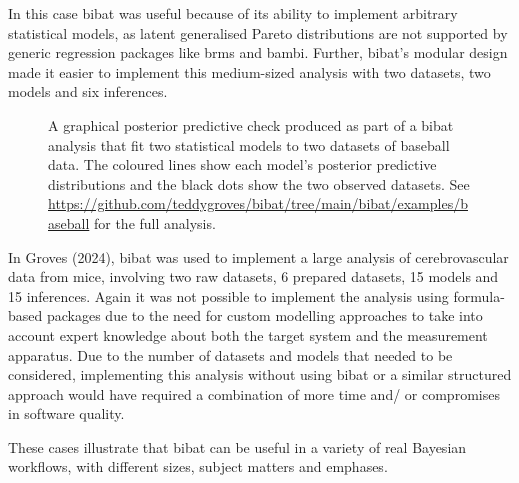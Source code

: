 \documentclass[
  letterpaper,
  DIV=11,
  numbers=noendperiod]{scrartcl}
\begin{document}
In this case bibat was useful because of its ability to implement
arbitrary statistical models, as latent generalised Pareto distributions
are not supported by generic regression packages like brms and bambi.
Further, bibat's modular design made it easier to implement this
medium-sized analysis with two datasets, two models and six inferences.

\begin{figure}


\caption{\label{fig-baseball}A graphical posterior predictive check
produced as part of a bibat analysis that fit two statistical models to
two datasets of baseball data. The coloured lines show each model's
posterior predictive distributions and the black dots show the two
observed datasets. See
\url{https://github.com/teddygroves/bibat/tree/main/bibat/examples/baseball}
for the full analysis.}

\end{figure}%

In Groves (2024), bibat was used to implement a large analysis of
cerebrovascular data from mice, involving two raw datasets, 6 prepared
datasets, 15 models and 15 inferences. Again it was not possible to
implement the analysis using formula-based packages due to the need for
custom modelling approaches to take into account expert knowledge about
both the target system and the measurement apparatus. Due to the number
of datasets and models that needed to be considered, implementing this
analysis without using bibat or a similar structured approach would have
required a combination of more time and/ or compromises in software
quality.

These cases illustrate that bibat can be useful in a variety of real
Bayesian workflows, with different sizes, subject matters and emphases.
\end{document}
